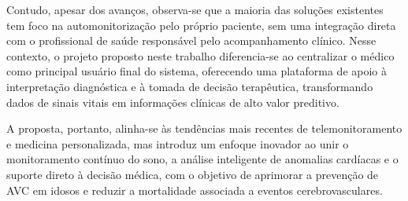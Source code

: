 Contudo, apesar dos avanços, observa-se que a maioria das soluções existentes tem foco na automonitorização pelo próprio paciente, sem uma integração direta com o profissional de saúde responsável pelo acompanhamento clínico. Nesse contexto, o projeto proposto neste trabalho diferencia-se ao centralizar o médico como principal usuário final do sistema, oferecendo uma plataforma de apoio à interpretação diagnóstica e à tomada de decisão terapêutica, transformando dados de sinais vitais em informações clínicas de alto valor preditivo.

A proposta, portanto, alinha-se às tendências mais recentes de telemonitoramento e medicina personalizada, mas introduz um enfoque inovador ao unir o monitoramento contínuo do sono, a análise inteligente de anomalias cardíacas e o suporte direto à decisão médica, com o objetivo de aprimorar a prevenção de AVC em idosos e reduzir a mortalidade associada a eventos cerebrovasculares.